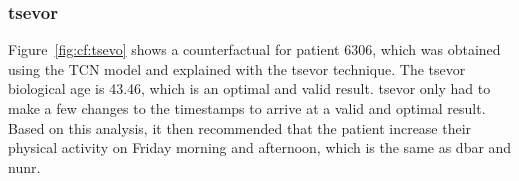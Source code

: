 \subsubsection{\gls{tsevor}}
Figure~\ref{fig:cf:tsevo} shows a counterfactual for patient $6306$, which was obtained using the TCN model and explained with the \gls{tsevor} technique.
The \gls{tsevor} biological age is 43.46, which is an optimal and valid result. \gls{tsevor} only had to make a few changes to the timestamps to arrive at a valid and optimal result. Based on this analysis, it then recommended that the patient increase their physical activity on Friday morning and afternoon, which is the same as \gls{dbar} and \gls{nunr}.


